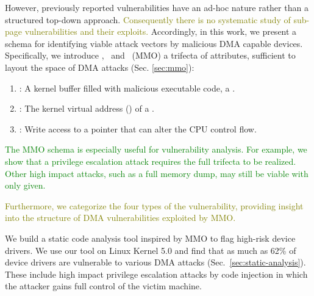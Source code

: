 However, previously reported vulnerabilities have an ad-hoc nature \cite{thunder,MMT16,Ben17b} rather than a structured top-down approach. 
\textcolor{olive}{Consequently there is no systematic study of sub-page vulnerabilities and their exploits.}
Accordingly, in this work, we present a schema for identifying viable attack vectors by malicious DMA capable devices. Specifically, we introduce \means,~\motivation{} and \oportunity~(MMO) a trifecta of attributes, sufficient to layout the space of DMA attacks (Sec. \ref{sec:mmo}):
\begin{enumerate}
    \item \motivation: A kernel buffer filled with malicious executable code, a \mabaf.
    \item \means: The kernel virtual address (\kva) of a \mabaf.
    \item \oportunity: Write access to a pointer that can alter the CPU control flow.
\end{enumerate} 

\textcolor{green}{The MMO schema is especially useful for vulnerability analysis. For example, we show that a privilege escalation attack requires the full trifecta to be realized. Other high impact attacks, such as a full memory dump, may still be viable with only \oportunity{} given.}

\textcolor{olive}{Furthermore, we categorize the four types of the \subpage{} vulnerability, providing insight into the structure of DMA vulnerabilities exploited by MMO.}


We build a static code analysis tool inspired by MMO to flag high-risk device drivers. 
We use our tool on Linux Kernel 5.0 and find that as much as 62\% of device drivers are vulnerable to various DMA attacks (Sec.~\ref{sec:static-analysis}). 
These include high impact privilege escalation attacks by code injection in which the attacker gains full control of the victim machine.


